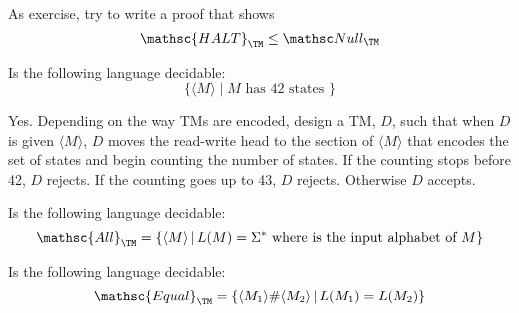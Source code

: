 As exercise, try to write a proof that shows
\[
\mathsc{HALT}_{\TM} \leq \Null_\TM
\]

\newpage
\newcommand\NULL{\mathsc{Null}}
\begin{ex}
Is the following language decidable:
\[
\{ \langle M \rangle \mid M \text{ has 42 states } \}
\]
\end{ex}


\newpage
\SOLUTION

Yes.
Depending on the way TMs are encoded,
design a TM, $D$, such that when $D$ is given $\langle M \rangle$,
$D$ moves the
read-write head to
the section of $\langle M \rangle$ that encodes the set of states
and begin counting the number of states.
If the counting stops before 42, $D$ rejects.
If the counting goes up to 43, $D$ rejects.
Otherwise $D$ accepts.


\newpage
\newcommand\ALL{\mathsc{All}}
\begin{ex}
Is the following language decidable:
\[
\ALL_\TM = \{ \langle M \rangle  \,|\, L(M) = \Sigma^*
\text{ where is the input alphabet of $M$} \}
\]
\end{ex}


\newpage
\begin{ex}
Is the following language decidable:
\[
\mathsc{Equal}_\TM =
\{
\langle M_1 \rangle
\#
\langle M_2 \rangle
\,|\, L(M_1) =  L(M_2)
\}
\]
\end{ex}

